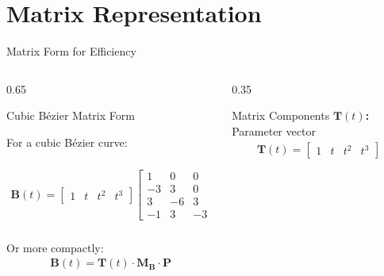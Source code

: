\section{Matrix Representation}

\begin{frame}{Matrix Form for Efficiency}
  \begin{columns}
    \begin{column}{0.65\textwidth}
      \begin{mathbox}{Cubic Bézier Matrix Form}

        For a cubic Bézier curve:{
          \scriptsize
          \begin{align*}
            \mathbf{B}(t) =
            \begin{bmatrix} 1 & t & t^2 & t^3
            \end{bmatrix}
            \begin{bmatrix}
              1 & 0 & 0 & 0 \\
              -3 & 3 & 0 & 0 \\
              3 & -6 & 3 & 0 \\
              -1 & 3 & -3 & 1
            \end{bmatrix}
            \begin{bmatrix}
              \mathbf{P_0} \\
              \mathbf{P_1} \\
              \mathbf{P_2} \\
              \mathbf{P_3}
            \end{bmatrix}
          \end{align*}

        }
        \vspace{0.3cm}
        Or more compactly:
        \begin{align*}
          \mathbf{B}(t) = \mathbf{T}(t) \cdot \mathbf{M_B} \cdot \mathbf{P}
        \end{align*}
      \end{mathbox}
    \end{column}
    \begin{column}{0.35\textwidth}
      \begin{conceptbox}{Matrix Components}
        \scriptsize
        \textbf{$\mathbf{T}(t)$:} Parameter vector
        \begin{align*}
          \mathbf{T}(t) =
          \begin{bmatrix} 1 & t & t^2 & t^3
          \end{bmatrix}
        \end{align*}


\end{conceptbox}
\end{column}
\end{columns}
\end{frame}
